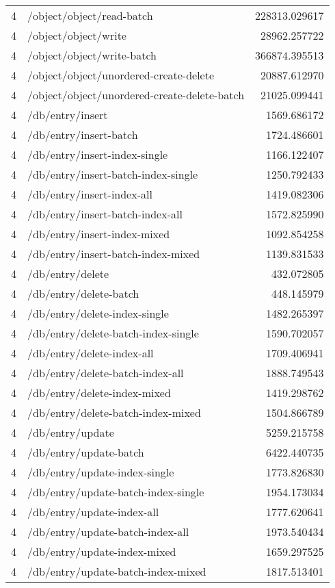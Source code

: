 \begin{longtable}{rlr}
4 & /object/object/read-batch & 228313.029617 \\
4 & /object/object/write & 28962.257722 \\
4 & /object/object/write-batch & 366874.395513 \\
4 & /object/object/unordered-create-delete & 20887.612970 \\
4 & /object/object/unordered-create-delete-batch & 21025.099441 \\
4 & /db/entry/insert & 1569.686172 \\
4 & /db/entry/insert-batch & 1724.486601 \\
4 & /db/entry/insert-index-single & 1166.122407 \\
4 & /db/entry/insert-batch-index-single & 1250.792433 \\
4 & /db/entry/insert-index-all & 1419.082306 \\
4 & /db/entry/insert-batch-index-all & 1572.825990 \\
4 & /db/entry/insert-index-mixed & 1092.854258 \\
4 & /db/entry/insert-batch-index-mixed & 1139.831533 \\
4 & /db/entry/delete & 432.072805 \\
4 & /db/entry/delete-batch & 448.145979 \\
4 & /db/entry/delete-index-single & 1482.265397 \\
4 & /db/entry/delete-batch-index-single & 1590.702057 \\
4 & /db/entry/delete-index-all & 1709.406941 \\
4 & /db/entry/delete-batch-index-all & 1888.749543 \\
4 & /db/entry/delete-index-mixed & 1419.298762 \\
4 & /db/entry/delete-batch-index-mixed & 1504.866789 \\
4 & /db/entry/update & 5259.215758 \\
4 & /db/entry/update-batch & 6422.440735 \\
4 & /db/entry/update-index-single & 1773.826830 \\
4 & /db/entry/update-batch-index-single & 1954.173034 \\
4 & /db/entry/update-index-all & 1777.620641 \\
4 & /db/entry/update-batch-index-all & 1973.540434 \\
4 & /db/entry/update-index-mixed & 1659.297525 \\
4 & /db/entry/update-batch-index-mixed & 1817.513401 \\

\end{longtable}

